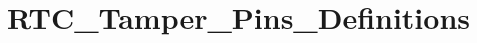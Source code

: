\hypertarget{group___r_t_c___tamper___pins___definitions}{\section{R\-T\-C\-\_\-\-Tamper\-\_\-\-Pins\-\_\-\-Definitions}
\label{group___r_t_c___tamper___pins___definitions}
}
